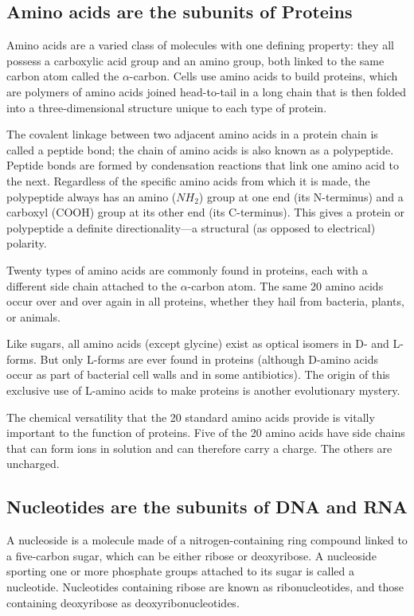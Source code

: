 \subsection{Amino acids are the subunits of Proteins}

Amino acids are a varied class of molecules with one defining property: 
they all possess a carboxylic acid group and an amino group, both
linked to the same carbon atom called the $\alpha$-carbon.
Cells use amino acids to build proteins, which are polymers of
amino acids joined head-to-tail in a long chain that is then folded into a
three-dimensional structure unique to each type of protein.

The covalent linkage between two adjacent amino acids in a protein
chain is called a peptide bond; the chain of amino acids is also known as
a polypeptide. Peptide bonds are formed by condensation
reactions that link one amino acid to the next. Regardless of the specific
amino acids from which it is made, the polypeptide always has an amino
($NH_{2}$) group at one end (its N-terminus) and a carboxyl (COOH) group at
its other end (its C-terminus). This gives a protein or polypeptide a definite
directionality—a structural (as opposed to electrical) polarity.

Twenty types of amino acids are commonly found in proteins, each with a
different side chain attached to the $\alpha$-carbon atom.
The same 20 amino acids occur over and over again in all proteins,
whether they hail from bacteria, plants, or animals.

Like sugars, all amino acids (except glycine) exist as optical isomers in D-
and L-forms. But only L-forms are ever found in proteins
(although D-amino acids occur as part of bacterial cell walls and in some
antibiotics). The origin of this exclusive use of L-amino acids to make
proteins is another evolutionary mystery.

The chemical versatility that the 20 standard amino acids provide is
vitally important to the function of proteins. Five of the 20 amino acids
have side chains that can form ions in solution and can therefore carry
a charge. The others are uncharged.

\subsection{Nucleotides are the subunits of DNA and RNA}

A nucleoside is a molecule made of a nitrogen-containing ring compound
linked to a five-carbon sugar, which can be either ribose or deoxyribose. 
A nucleoside sporting one or more phosphate
groups attached to its sugar is called a nucleotide. Nucleotides containing
ribose are known as ribonucleotides, and those containing deoxyribose as
deoxyribonucleotides.

